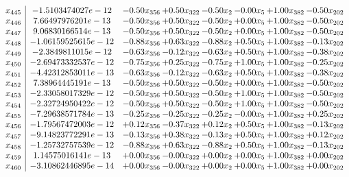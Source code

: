 \documentclass[8pt]{article}
\begin{document}
\[\begin{array}{c| c c@{\hskip 2pt} c@{\hskip 2pt} c@{\hskip 2pt} c@{\hskip 2pt} c@{\hskip 2pt} c@{\hskip 2pt} }
 x_{445}   &  -1.5103474027e-12 & -0.50 x_{356} & +  0.50 x_{322} & -0.50 x_{2} & -0.00 x_{5} & +  1.00 x_{382} & -0.50 x_{202}\\
 x_{446}   &  7.66497976201e-13 & -0.50 x_{356} & +  0.50 x_{322} & -0.50 x_{2} & +  0.00 x_{5} & +  1.00 x_{382} & -0.50 x_{202}\\
 x_{447}   &  9.06830166514e-13 & -0.50 x_{356} & +  0.50 x_{322} & -0.50 x_{2} & +  0.00 x_{5} & +  1.00 x_{382} & -0.50 x_{202}\\
 x_{448}   &  -1.06159525615e-12 & -0.88 x_{356} & +  0.63 x_{322} & -0.88 x_{2} & +  0.50 x_{5} & +  1.00 x_{382} & -0.13 x_{202}\\
 x_{449}   &  -2.3849811015e-12 & -0.63 x_{356} & -0.12 x_{322} & -0.63 x_{2} & +  0.50 x_{5} & +  1.00 x_{382} & -0.38 x_{202}\\
 x_{450}   &  -2.69473332537e-12 & -0.75 x_{356} & +  0.25 x_{322} & -0.75 x_{2} & +  1.00 x_{5} & +  1.00 x_{382} & -0.25 x_{202}\\
 x_{451}   &  -4.42312853011e-13 & -0.63 x_{356} & -0.12 x_{322} & -0.63 x_{2} & +  0.50 x_{5} & +  1.00 x_{382} & -0.38 x_{202}\\
 x_{452}   &  7.38964445191e-13 & -0.50 x_{356} & +  0.50 x_{322} & -0.50 x_{2} & +  0.00 x_{5} & +  1.00 x_{382} & -0.50 x_{202}\\
 x_{453}   &  -2.33058017329e-12 & -0.50 x_{356} & +  0.50 x_{322} & -0.50 x_{2} & +  1.00 x_{5} & +  1.00 x_{382} & -0.50 x_{202}\\
 x_{454}   &  -2.32724950422e-12 & -0.50 x_{356} & +  0.50 x_{322} & -0.50 x_{2} & +  1.00 x_{5} & +  1.00 x_{382} & -0.50 x_{202}\\
 x_{455}   &  -7.29638571784e-13 & -0.25 x_{356} & -0.25 x_{322} & -0.25 x_{2} & -0.00 x_{5} & +  1.00 x_{382} & +  0.25 x_{202}\\
 x_{456}   &  -1.79567472003e-12 & +  0.12 x_{356} & -0.37 x_{322} & +  0.12 x_{2} & +  0.50 x_{5} & +  1.00 x_{382} & -0.13 x_{202}\\
 x_{457}   &  -9.14823772291e-13 & -0.13 x_{356} & +  0.38 x_{322} & -0.13 x_{2} & +  0.50 x_{5} & +  1.00 x_{382} & +  0.12 x_{202}\\
 x_{458}   &  -1.25732757539e-12 & -0.88 x_{356} & +  0.63 x_{322} & -0.88 x_{2} & +  0.50 x_{5} & +  1.00 x_{382} & -0.13 x_{202}\\
 x_{459}   &  1.14575016141e-13 & +  0.00 x_{356} & -0.00 x_{322} & +  0.00 x_{2} & +  0.00 x_{5} & +  1.00 x_{382} & +  0.00 x_{202}\\
 x_{460}   &  -3.10862446895e-14 & +  0.00 x_{356} & -0.00 x_{322} & +  0.00 x_{2} & +  0.00 x_{5} & +  1.00 x_{382} & +  0.00 x_{202}\\

\end{array}\]
\end{document}
